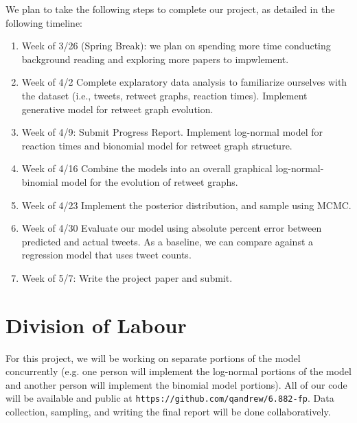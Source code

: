 \documentclass[runningheads]{article}
\begin{document}
We plan to take the following steps to complete our project, as detailed in the following timeline:





\begin{enumerate}
    \item Week of 3/26 (Spring Break): we plan on spending more time conducting background reading and exploring more papers to impwlement.
    \item Week of 4/2 Complete explaratory data analysis to familiarize ourselves with the dataset (i.e., tweets, retweet graphs, reaction times). Implement generative model for retweet graph evolution.
    \item Week of 4/9: Submit Progress Report. Implement log-normal model for reaction times and bionomial model for retweet graph structure. 
    \item Week of 4/16 Combine the models into an overall graphical log-normal-binomial model for the evolution of retweet graphs.
    \item Week of 4/23 Implement the posterior distribution, and sample using MCMC.
    \item Week of 4/30 Evaluate our model using absolute percent error between predicted and actual tweets. As a baseline, we can compare against a regression model that uses tweet counts.
    \item Week of 5/7: Write the project paper and submit.
    
\end{enumerate}

\section{Division of Labour}

For this project, we will be working on separate portions of the model concurrently (e.g. one person will implement the log-normal portions of the model and another person will implement the binomial model portions). All of our code will be available and public at \texttt{https://github.com/qandrew/6.882-fp}. Data collection, sampling, and writing the final report will be done collaboratively.
\end{document}
